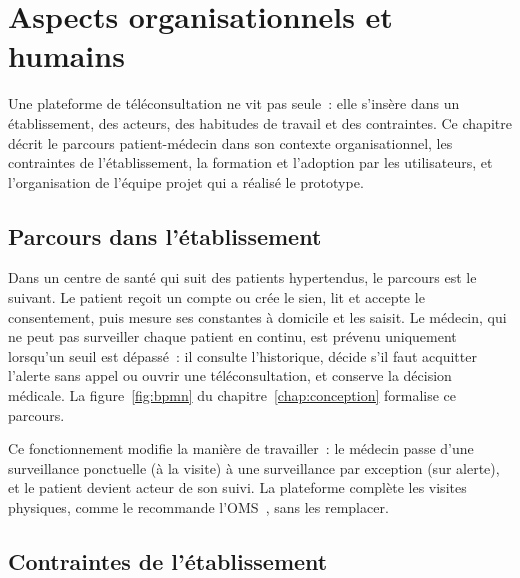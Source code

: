 \chapter{Aspects organisationnels et humains}
\label{chap:organisation}

\introchap

Une plateforme de téléconsultation ne vit pas seule~: elle s'insère dans un établissement, des acteurs, des habitudes de travail et des contraintes. Ce chapitre décrit le parcours patient-médecin dans son contexte organisationnel, les contraintes de l'établissement, la formation et l'adoption par les utilisateurs, et l'organisation de l'équipe projet qui a réalisé le prototype.

\section{Parcours dans l'établissement}

Dans un centre de santé qui suit des patients hypertendus, le parcours est le suivant. Le patient reçoit un compte ou crée le sien, lit et accepte le consentement, puis mesure ses constantes à domicile et les saisit. Le médecin, qui ne peut pas surveiller chaque patient en continu, est prévenu uniquement lorsqu'un seuil est dépassé~: il consulte l'historique, décide s'il faut acquitter l'alerte sans appel ou ouvrir une téléconsultation, et conserve la décision médicale. La figure~\ref{fig:bpmn} du chapitre~\ref{chap:conception} formalise ce parcours.

Ce fonctionnement modifie la manière de travailler~: le médecin passe d'une surveillance ponctuelle (à la visite) à une surveillance par exception (sur alerte), et le patient devient acteur de son suivi. La plateforme complète les visites physiques, comme le recommande l'\ac{OMS}~\cite{oms2010}, sans les remplacer.

\section{Contraintes de l'établissement}

